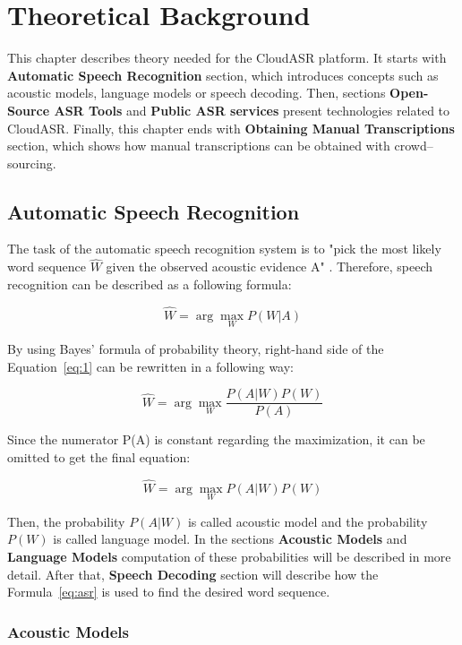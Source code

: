 \chapter{Theoretical Background}
This chapter describes theory needed for the CloudASR platform.
It starts with \textbf{Automatic Speech Recognition} section,
  which introduces concepts such as acoustic models, language models or speech decoding.
Then, sections \textbf{Open-Source ASR Tools} and \textbf{Public ASR services} present technologies related to CloudASR.
Finally, this chapter ends with \textbf{Obtaining Manual Transcriptions} section,
  which shows how manual transcriptions can be obtained with crowd--sourcing.

\section{Automatic Speech Recognition}
The task of the automatic speech recognition system is to "pick the most likely word sequence $\widehat{W}$
  given the observed acoustic evidence A" \cite{frederick1997statistical}.
Therefore, speech recognition can be described as a following formula:

\begin{equation}
  \label{eq:1}
  \widehat{W} = \arg \max_{W} P(W|A)
\end{equation}

By using Bayes' formula of probability theory,
  right-hand side of the Equation~\ref{eq:1} can be rewritten in a following way:

\begin{equation}
 \widehat{W} = \arg \max_{W} \frac{P(A|W) P(W)}{P(A)}
\end{equation}

Since the numerator P(A) is constant regarding the maximization,
  it can be omitted to get the final equation:

\begin{equation}
  \label{eq:asr}
  \widehat{W} = \arg \max_{W} P(A|W) P(W)
\end{equation}

Then, the probability $P(A|W)$ is called acoustic model and the probability $P(W)$ is called language model.
In the sections \textbf{Acoustic Models} and \textbf{Language Models} computation of these probabilities will be described in more detail.
After that, \textbf{Speech Decoding} section will describe how the Formula~\ref{eq:asr} is used to find the desired word sequence.


\subsection{Acoustic Models}
\BLIND
\BLIND

